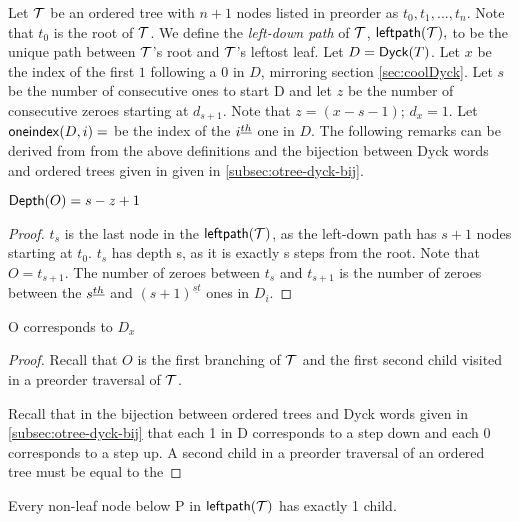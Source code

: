 Let $\mathcal{T}$ be an ordered tree with $n+1$ nodes listed in preorder as $t_0,t_1,...,t_n$.  Note that $t_0$ is the root of $\mathcal{T}$. We define the \emph{left-down path} of $\mathcal{T}$, $\mathsf{leftpath}{(\mathcal{\mathcal{T}})},$ to be the unique path between $\mathcal{T}$'s root and $\mathcal{T}$'s leftost leaf.
Let $D=\mathsf{Dyck}{(T)}$.  Let $x$ be the index of the first $1$ following a $0$ in $D$, mirroring section \ref{sec:coolDyck}.  Let $s$ be the number of consecutive ones to start D and let $z$ be the number of consecutive zeroes starting at $d_{s+1}$.  Note that $z=(x-s-1)$; $d_{x}=1$.  Let $\mathsf{oneindex}({D}, i)=$ be the index of the $i^{\underline{th}}{}$ one in $D$.
The following remarks can be derived from from the above definitions and the bijection between Dyck words and ordered trees given in given in \ref{subsec:otree-dyck-bij}.


\begin{remark} $\mathsf{Depth}{(O)}=s-z+1$ \label{re:o_depth_formula}
\end{remark} 
\begin{proof}


    $t_s$ is the last node in the $\mathsf{leftpath}{(\mathcal{\mathcal{T}})}$, as the left-down path has $s+1$ nodes starting at $t_0$. $t_s$ has depth s, as it is exactly s steps from the root.  Note that $O=t_{s+1}$.  The number of zeroes between $t_s$ and $t_{s+1}$ is the number of zeroes between the $s^{\underline{th}}$ and $(s+1)^{\underline{st}}$ ones in $D_i$.  

\end{proof} 
\begin{remark}O corresponds to $D_x$%
\end{remark}
\begin{proof}
    Recall that $O$ is the first branching of $\mathcal{T}$ and the first second child visited in a preorder traversal of $\mathcal{T}$.

    Recall that in the bijection between ordered trees and Dyck words given in \ref{subsec:otree-dyck-bij} that each 1 in D corresponds to a step down and each 0 corresponds to a step up.  A second child in a preorder traversal of an ordered tree must be equal to the 

\end{proof}
\begin{remark} Every non-leaf node below P in $\mathsf{leftpath}{(\mathcal{\mathcal{T}})}$ has exactly 1 child.  \label{rem:left-is-path}
\end{remark}

